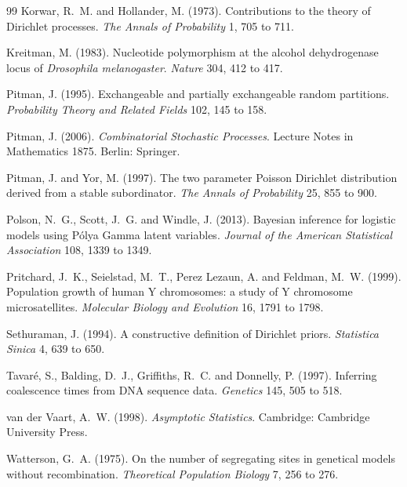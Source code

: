 \begin{thebibliography}{99}
Korwar, R.~M. and Hollander, M. (1973). Contributions to the theory of Dirichlet processes.
\emph{The Annals of Probability} 1, 705 to 711.

Kreitman, M. (1983). Nucleotide polymorphism at the alcohol dehydrogenase locus of
\emph{Drosophila melanogaster}. \emph{Nature} 304, 412 to 417.

Pitman, J. (1995). Exchangeable and partially exchangeable random partitions. \emph{Probability
Theory and Related Fields} 102, 145 to 158.

Pitman, J. (2006). \emph{Combinatorial Stochastic Processes}. Lecture Notes in Mathematics 1875.
Berlin: Springer.

Pitman, J. and Yor, M. (1997). The two parameter Poisson Dirichlet distribution derived from a
stable subordinator. \emph{The Annals of Probability} 25, 855 to 900.

Polson, N.~G., Scott, J.~G. and Windle, J. (2013). Bayesian inference for logistic models using
P\'olya Gamma latent variables. \emph{Journal of the American Statistical Association} 108, 1339
to 1349.

Pritchard, J.~K., Seielstad, M.~T., Perez Lezaun, A. and Feldman, M.~W. (1999). Population growth
of human Y chromosomes: a study of Y chromosome microsatellites. \emph{Molecular Biology and
Evolution} 16, 1791 to 1798.

Sethuraman, J. (1994). A constructive definition of Dirichlet priors. \emph{Statistica Sinica} 4,
639 to 650.

Tavar\'e, S., Balding, D.~J., Griffiths, R.~C. and Donnelly, P. (1997). Inferring coalescence
times from DNA sequence data. \emph{Genetics} 145, 505 to 518.

van der Vaart, A.~W. (1998). \emph{Asymptotic Statistics}. Cambridge: Cambridge University Press.

Watterson, G.~A. (1975). On the number of segregating sites in genetical models without
recombination. \emph{Theoretical Population Biology} 7, 256 to 276.

\end{thebibliography}
